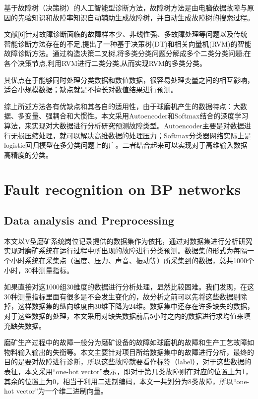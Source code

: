 \documentclass{ctacn}%
\begin{document}
\begin{multicols}{2}
基于故障树（决策树）的人工智能型诊断方法，故障树方法是由电脑依据故障与原因的先验知识和故障率知识自动辅助生成故障树，并自动生成故障树的搜索过程。

文献[6]针对故障诊断面临的故障样本少、非线性强、多故障处理等问题以及传统智能诊断方法存在的不足,提出了一种基于决策树(DT)和相关向量机(RVM)的智能故障诊断方法。通过构造决策二叉树,将多类分类问题分解成多个二类分类问题;在各个决策节点,利用RVM进行二类分类,从而实现RVM的多类分类。

其优点在于能够同时处理分类数据和数值数据，很容易处理变量之间的相互影响，适合小规模数据；缺点就是不擅长对数值结果进行预测。

综上所述方法各有优缺点和其各自的适用性，由于球磨机产生的数据特点：大数据、多变量、强耦合和大惯性。本文采用Autoencoder和Softmax结合的深度学习算法，来实现对大数据进行分析研究预测故障类型。Autoencoder主要是对数据进行无损压缩处理，就可以解决高维数据的处理压力；Softmax分类器网络实际上是logistic回归模型在多分类问题上的广。二者结合起来可以实现对于高维输入数据高精度的分类。

\section{Fault recognition on BP networks}

\subsection{Data analysis and Preprocessing}
本文以V型磨矿系统岗位记录提供的数据集作为依托，通过对数据集进行分析研究实现对磨矿系统在运行过程中所出现的故障进行分类预测。数据集的形式为每隔一个小时系统在采集点（温度、压力、声音、振动等）所采集到的数据，总共1000个小时，30种测量指标。

如果直接对这1000组30维度的数据进行分析处理，显然比较困难。我们发现，在这30种测量指标里面有很多是不会发生变化的，故分析之前可以先将这些数据剔除掉，这样数据集的纵向维度由30维下降为24维。数据集中还存在许多缺失的数据，对于这些数据的处理，本文采用对缺失数据前后5小时之内的数据进行求均值来填充缺失数据。

磨矿生产过程中的故障一般分为磨矿设备的故障如球磨机的故障和生产工艺故障如物料输入输出的失衡等。本文主要针对项目所给数据集中的故障进行分析，最终的目的是要对故障进行诊断，所以这些故障就要看作标签（label），对于这些数据的表征，本文采用“one-hot vector”表示，即对于第几类故障则在对应的位置上为1，其余的位置上为0，相当于利用二进制编码，本文一共划分为8类故障，所以“one-hot vector”为一个维二进制向量。


\end{multicols}
\end{document}

